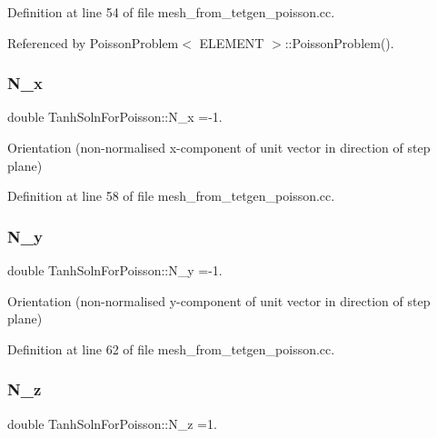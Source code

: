 Definition at line 54 of file mesh\+\_\+from\+\_\+tetgen\+\_\+poisson.\+cc.



Referenced by Poisson\+Problem$<$ E\+L\+E\+M\+E\+N\+T $>$\+::\+Poisson\+Problem().

\mbox{\label{namespaceTanhSolnForPoisson_ac3d25f0791c1363f487600e02757bc97}} 
\subsubsection{\texorpdfstring{N\+\_\+x}{N\_x}}
{\footnotesize\ttfamily double Tanh\+Soln\+For\+Poisson\+::\+N\+\_\+x =-\/1.}



Orientation (non-\/normalised x-\/component of unit vector in direction of step plane) 



Definition at line 58 of file mesh\+\_\+from\+\_\+tetgen\+\_\+poisson.\+cc.

\mbox{\label{namespaceTanhSolnForPoisson_a482d668ef91071985d1f4ce7cf29a926}} 
\subsubsection{\texorpdfstring{N\+\_\+y}{N\_y}}
{\footnotesize\ttfamily double Tanh\+Soln\+For\+Poisson\+::\+N\+\_\+y =-\/1.}



Orientation (non-\/normalised y-\/component of unit vector in direction of step plane) 



Definition at line 62 of file mesh\+\_\+from\+\_\+tetgen\+\_\+poisson.\+cc.

\mbox{\label{namespaceTanhSolnForPoisson_ae6b5b5d21747a45776004756dc97dc5c}} 
\subsubsection{\texorpdfstring{N\+\_\+z}{N\_z}}
{\footnotesize\ttfamily double Tanh\+Soln\+For\+Poisson\+::\+N\+\_\+z =1.}



